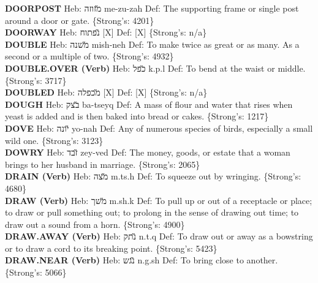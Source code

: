 {\textbf{DOORPOST} Heb: {\large\H מזוזה} me-zu-zah Def: The supporting frame or single post around a door or gate. \{Strong's: 4201\}\hfill{}\\

\textbf{DOORWAY} Heb: {\large\H נפתוח} {[}X{]} Def: {[}X{]} \{Strong's: n/a\}\hfill{}\\

\textbf{DOUBLE} Heb: {\large\H משנה} mish-neh Def: To make twice as great or as many. As a second or a multiple of two. \{Strong's: 4932\}\hfill{}\\

\textbf{DOUBLE.OVER (Verb)} Heb: {\large\H כפל} k.p.l Def: To bend at the waist or middle. \{Strong's: 3717\}\hfill{}\\

\textbf{DOUBLED} Heb: {\large\H מכפלה} {[}X{]} Def: {[}X{]} \{Strong's: n/a\}\hfill{}\\

\textbf{DOUGH} Heb: {\large\H בצק} ba-tseyq Def: A mass of flour and water that rises when yeast is added and is then baked into bread or cakes. \{Strong's: 1217\}\hfill{}\\

\textbf{DOVE} Heb: {\large\H יונה} yo-nah Def: Any of numerous species of birds, especially a small wild one. \{Strong's: 3123\}\hfill{}\\

\textbf{DOWRY} Heb: {\large\H זבד} zey-ved Def: The money, goods, or estate that a woman brings to her husband in marriage. \{Strong's: 2065\}\hfill{}\\

\textbf{DRAIN (Verb)} Heb: {\large\H מצה} m.ts.h Def: To squeeze out by wringing. \{Strong's: 4680\}\hfill{}\\

\textbf{DRAW (Verb)} Heb: {\large\H משך} m.sh.k Def: To pull up or out of a receptacle or place; to draw or pull something out; to prolong in the sense of drawing out time; to draw out a sound from a horn. \{Strong's: 4900\}\hfill{}\\

\textbf{DRAW.AWAY (Verb)} Heb: {\large\H נתק} n.t.q Def: To draw out or away as a bowstring or to draw a cord to its breaking point. \{Strong's: 5423\}\hfill{}\\

\textbf{DRAW.NEAR (Verb)} Heb: {\large\H נגש} n.g.sh Def: To bring close to another. \{Strong's: 5066\}\hfill{}\\

}

